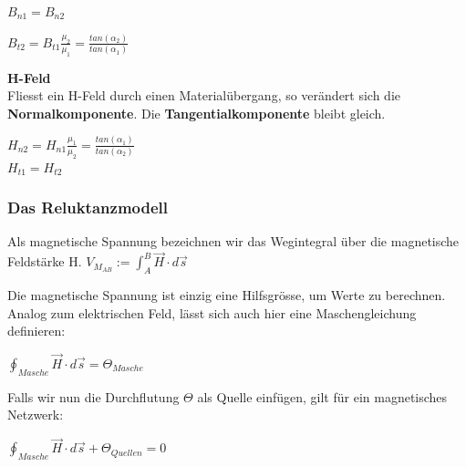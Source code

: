 \formulaBegin
$ \displaystyle B_{n1} = B_{n2}$
\\ \fspace

$\displaystyle B_{t2} = B_{t1} \frac{\mu_2}{\mu_1}  = \frac{tan(\alpha_2)}{tan(\alpha_1)}$
\formulaEnd

\textbf{H-Feld} \\
Fliesst ein H-Feld durch einen Materialübergang, so verändert sich die \textbf{Normalkomponente}. Die \textbf{Tangentialkomponente} bleibt gleich.

\begin{center}
\end{center}

\formulaBegin

$\displaystyle H_{n2} = H_{n1} \frac{\mu_1}{\mu_2} = \frac{tan(\alpha_1)}{tan(\alpha_2)} $ \\
\fspace
$ \displaystyle H_{t1} = H_{t2}$
\formulaEnd




\subsubsection{Das Reluktanzmodell}

\beginip
Als magnetische Spannung bezeichnen wir das Wegintegral über die magnetische Feldstärke H.
\formulaBegin
$\displaystyle V_{M_{AB}} := \int_A^B \vec{H} \cdot d\vec{s}$
\formulaEnd

Die magnetische Spannung ist einzig eine Hilfsgrösse, um Werte zu berechnen. \\
Analog zum elektrischen Feld, lässt sich auch hier eine Maschengleichung definieren: \\
\begin{center}
	$\displaystyle \oint_{Masche} \vec{H} \cdot d\vec{s} = \Theta_{Masche}$
\end{center}
Falls wir nun die Durchflutung $\Theta$ als Quelle einfügen, gilt für ein magnetisches Netzwerk:
\begin{center}
	$\displaystyle \oint_{Masche} \vec{H} \cdot d\vec{s} + \Theta_{Quellen} = 0$
\end{center}
\iend

